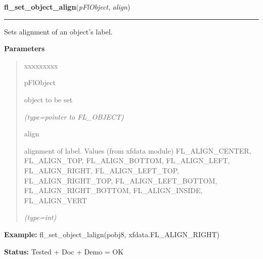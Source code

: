 \hspace{.8\funcindent}\begin{boxedminipage}{\funcwidth}

    \raggedright \textbf{fl\_set\_object\_align}(\textit{pFlObject}, \textit{align})

    \vspace{-1.5ex}

    \rule{\textwidth}{0.5\fboxrule}
\setlength{\parskip}{2ex}
    Sets alignment of an object's label.

\setlength{\parskip}{1ex}
      \textbf{Parameters}
      \vspace{-1ex}

      \begin{quote}
        \begin{Ventry}{xxxxxxxxx}

          \item[pFlObject]

          object to be set

            {\it (type=pointer to FL\_OBJECT)}

          \item[align]

          alignment of label. Values (from xfdata module) 
          FL\_ALIGN\_CENTER, FL\_ALIGN\_TOP, FL\_ALIGN\_BOTTOM, 
          FL\_ALIGN\_LEFT, FL\_ALIGN\_RIGHT, FL\_ALIGN\_LEFT\_TOP, 
          FL\_ALIGN\_RIGHT\_TOP, FL\_ALIGN\_LEFT\_BOTTOM, 
          FL\_ALIGN\_RIGHT\_BOTTOM, FL\_ALIGN\_INSIDE, FL\_ALIGN\_VERT

            {\it (type=int)}

        \end{Ventry}

      \end{quote}

\textbf{Example:} fl\_set\_object\_lalign(pobj8, xfdata.FL\_ALIGN\_RIGHT)



\textbf{Status:} Tested + Doc + Demo = OK



    \end{boxedminipage}

    \label{xformslib:flbasic:fl_set_object_shortcut}

    \vspace{0.5ex}

